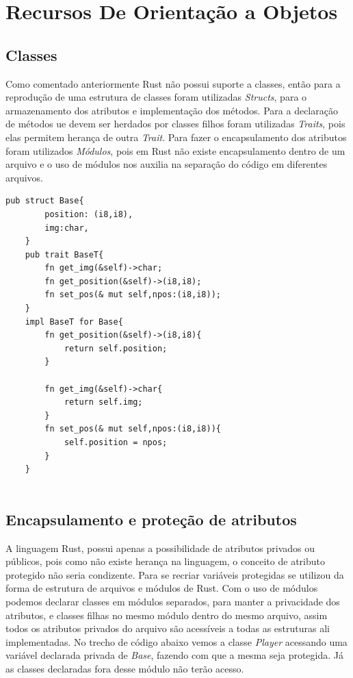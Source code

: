 \documentclass[rel_mlp]{iiufrgs}
\begin{document}
 
 \chapter{Recursos De Orientação a Objetos}

 
 \section{Classes}
 Como comentado anteriormente Rust não possui suporte a classes, então para a reprodução de uma estrutura de classes foram utilizadas \textit{Structs}, para o armazenamento dos atributos e implementação dos métodos. Para a declaração de métodos ue devem ser herdados por classes filhos foram utilizadas \textit{Traits}, pois elas permitem herança de outra \textit{Trait}. Para fazer o encapsulamento dos atributos foram utilizados \textit{Módulos}, pois em Rust não existe encapsulamento dentro de um arquivo e o uso de módulos nos auxilia na separação do código em diferentes arquivos.
 \begin{lstlisting}[frame = single]
    pub struct Base{
        position: (i8,i8),
        img:char,
    }
    pub trait BaseT{
        fn get_img(&self)->char;
        fn get_position(&self)->(i8,i8);
        fn set_pos(& mut self,npos:(i8,i8));
    }
    impl BaseT for Base{
        fn get_position(&self)->(i8,i8){
            return self.position;
        }
    
        fn get_img(&self)->char{
            return self.img;
        }
        fn set_pos(& mut self,npos:(i8,i8)){
            self.position = npos;
        }
    }
    
 \end{lstlisting}
 
 
 
 \section{Encapsulamento e proteção de atributos}
  A linguagem Rust, possui apenas a possibilidade de atributos privados ou públicos, pois como não existe herança na linguagem, o conceito de atributo protegido não seria condizente. Para se recriar variáveis protegidas se utilizou da forma de estrutura de arquivos e módulos de Rust. Com o uso de módulos podemos declarar classes em módulos separados, para manter a privacidade dos atributos, e classes filhas no mesmo módulo dentro do mesmo arquivo, assim todos os atributos privados do arquivo são acessíveis a todas as estruturas ali implementadas. No trecho de código abaixo vemos a classe \textit{Player} acessando uma variável declarada privada de \textit{Base}, fazendo com que a mesma seja protegida. Já as classes declaradas fora desse módulo não terão acesso.
  
\end{document}
